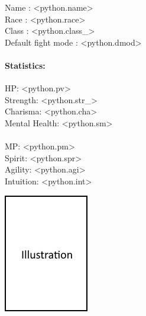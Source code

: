 \begin{multicols}{2}
\begin{minipage}{1.25\linewidth}%
\raggedright
Name : <python.name> \\[4pt]
Race : <python.race> \\[4pt]
Class : <python.class_> \\[4pt]
Default fight mode : <python.dmod> \\[4pt]

\paragraph{Statistics:}
\begin{multicols}{2}%
\setlength{\columnsep}{40pt}
\begin{minipage}{1\linewidth}%
\raggedright
\vskip 4pt
HP: <python.pv> \\[4pt]
Strength: <python.str_> \\[4pt]
Charisma: <python.cha> \\[4pt]
Mental Health: <python.sm> \\[4pt]
\end{minipage}%
\columnbreak
\paragraph{}
\begin{minipage}{1\linewidth}%
\raggedright
\vskip 4pt
MP: <python.pm> \\[4pt]
Spirit: <python.spr> \\[4pt]
Agility: <python.agi> \\[4pt]
Intuition: <python.int> \\[4pt]
\end{minipage}%
\end{multicols}%
\end{minipage}%

\columnbreak

\begin{flushright}
    \includegraphics[scale=1]{empty.jpg}
\end{flushright}

\end{multicols}
